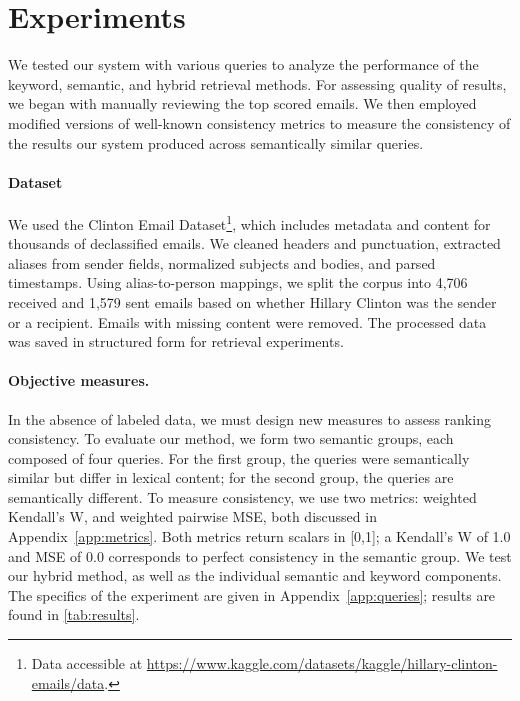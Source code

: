 \documentclass{article}
\begin{document}
\section{Experiments}
We tested our system with various queries to analyze the performance of the keyword, semantic, and hybrid retrieval methods. For assessing quality of results, we began with manually reviewing the top scored emails. We then employed modified versions of well-known consistency metrics to measure the consistency of the results our system produced across semantically similar queries. 

\paragraph{Dataset}
We used the Clinton Email Dataset\footnote{Data accessible at \url{https://www.kaggle.com/datasets/kaggle/hillary-clinton-emails/data}.}, which includes metadata and content for thousands of declassified emails. We cleaned headers and punctuation, extracted aliases from sender fields, normalized subjects and bodies, and parsed timestamps. Using alias-to-person mappings, we split the corpus into 4,706 received and 1,579 sent emails based on whether Hillary Clinton was the sender or a recipient. Emails with missing content were removed. The processed data was saved in structured form for retrieval experiments.

\paragraph{Objective measures.} 
In the absence of labeled data, we must design new measures to assess ranking consistency. To evaluate our method, we form two semantic groups, each composed of four queries. For the first group, the queries were semantically similar but differ in lexical content; for the second group, the queries are semantically different. To measure consistency, we use two metrics: weighted Kendall's W, and weighted pairwise MSE, both discussed in Appendix~\ref{app:metrics}. Both metrics return scalars in [0,1]; a Kendall's W of 1.0 and MSE of 0.0 corresponds to perfect consistency in the semantic group. We test our hybrid method, as well as the individual semantic and keyword components. The specifics of the experiment are given in Appendix~\ref{app:queries}; results are found in \ref{tab:results}.
\end{document}
